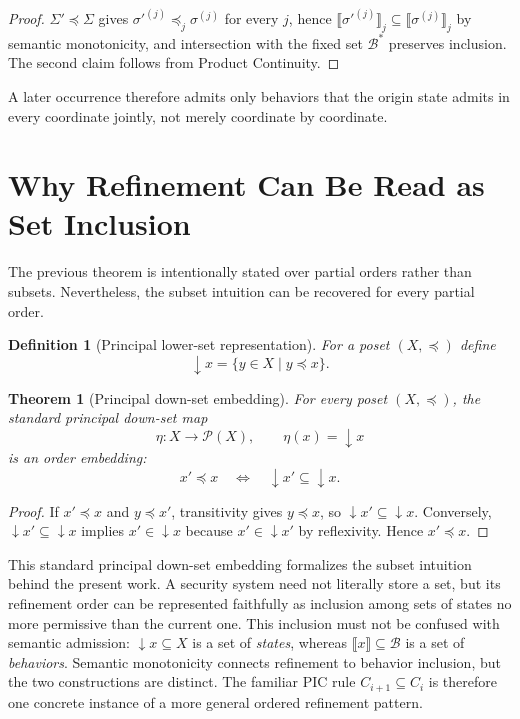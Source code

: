 \documentclass[10pt,twocolumn]{article}
\newcommand{\sem}[1]{\llbracket #1 \rrbracket}
\newcommand{\powerset}{\mathcal{P}}
\newcommand{\state}{\Sigma}
\newcommand{\coord}{\sigma}
\newtheorem{definition}{Definition}
\newtheorem{theorem}{Theorem}
\begin{document}
\begin{proof}
$\state'\preceq\state$ gives $\coord'^{(j)}\preceq_j\coord^{(j)}$ for
every $j$, hence $\sem{\coord'^{(j)}}_j\subseteq\sem{\coord^{(j)}}_j$ by
semantic monotonicity, and intersection with the fixed set $\mathcal B^*$ preserves inclusion. The
second claim follows from Product Continuity.
\end{proof}

A later occurrence therefore admits only behaviors that the origin state
admits in every coordinate jointly, not merely coordinate by coordinate.


\section{Why Refinement Can Be Read as Set Inclusion}

The previous theorem is intentionally stated over partial orders rather than
subsets.  Nevertheless, the subset intuition can be recovered for every
partial order.

\begin{definition}[Principal lower-set representation]
For a poset $(X,\preceq)$ define
\begin{equation}
  \downarrow x
  =\{y\in X\mid y\preceq x\}.
\end{equation}
\end{definition}

\begin{theorem}[Principal down-set embedding]
For every poset $(X,\preceq)$, the standard principal down-set map
\begin{equation}
  \eta:X\to\powerset(X),
  \qquad
  \eta(x)=\downarrow x
\end{equation}
is an order embedding:
\begin{equation}
  x'\preceq x
  \quad\Longleftrightarrow\quad
  \downarrow x'\subseteq\downarrow x.
  \label{eq:downset-embedding}
\end{equation}
\end{theorem}

\begin{proof}
If $x'\preceq x$ and $y\preceq x'$, transitivity gives $y\preceq x$, so
$\downarrow x'\subseteq\downarrow x$.  Conversely,
$\downarrow x'\subseteq\downarrow x$ implies $x'\in\downarrow x$ because
$x'\in\downarrow x'$ by reflexivity.  Hence $x'\preceq x$.
\end{proof}

This standard principal down-set embedding formalizes the subset intuition
behind the present work. A security system need not literally store a set, but
its refinement order can be represented faithfully as inclusion among sets of
states no more permissive than the current one. This inclusion must not be
confused with semantic admission: $\downarrow x\subseteq X$ is a set of
\emph{states}, whereas $\sem{x}\subseteq\mathcal{B}$ is a set of
\emph{behaviors}. Semantic monotonicity connects refinement to behavior
inclusion, but the two constructions are distinct. The familiar PIC rule
$C_{i+1}\subseteq C_i$ is therefore one concrete instance of a more general
ordered refinement pattern.
\end{document}
